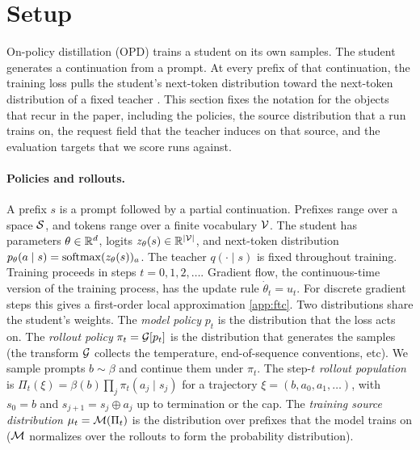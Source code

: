\section{Setup}
\label{sec:setup}

On-policy distillation (OPD) trains a student on its own samples. The student generates a continuation from a prompt. At every prefix of that continuation, the training loss pulls the student's next-token distribution toward the next-token distribution of a fixed teacher \citep{gu2023minillm,agarwal2024onpolicydistillation,tinker_opd_2025}. This section fixes the notation for the objects that recur in the paper, including the policies, the source distribution that a run trains on, the request field that the teacher induces on that source, and the evaluation targets that we score runs against.

\paragraph{Policies and rollouts.}
A prefix $s$ is a prompt followed by a partial continuation. Prefixes range over a space $\mathcal{S}$, and tokens range over a finite vocabulary $\mathcal{V}$. The student has parameters $\theta \in \mathbb{R}^d$, logits $z_\theta(s) \in \mathbb{R}^{|\mathcal{V}|}$, and next-token distribution $p_\theta(a \mid s) = \mathrm{softmax}(z_\theta(s))_a$. The teacher $q(\cdot \mid s)$ is fixed throughout training. Training proceeds in steps $t = 0, 1, 2, \ldots$. Gradient flow, the continuous-time version of the training process, has the update rule $\dot\theta_t = u_t$. For discrete gradient steps this gives a first-order local approximation \cref{app:ftc}. Two distributions share the student's weights. The \emph{model policy} $p_t$ is the distribution that the loss acts on. The \emph{rollout policy} $\pi_t = \mathcal{G}[p_t]$ is the distribution that generates the samples (the transform $\mathcal{G}$ collects the temperature, end-of-sequence conventions, etc). We sample prompts $b\sim\beta$ and continue them under $\pi_t$. The step-$t$ \emph{rollout population} is $\Pi_t(\xi)=\beta(b)\prod_{j}\pi_t(a_j\mid s_j)$ for a trajectory $\xi=(b,a_0,a_1,\ldots)$, with $s_0=b$ and $s_{j+1}=s_j\oplus a_j$ up to termination or the cap. The \emph{training source distribution} $\mu_t = \mathcal{M}(\Pi_t)$ is the distribution over prefixes that the model trains on ($\mathcal{M}$ normalizes over the rollouts to form the probability distribution).

